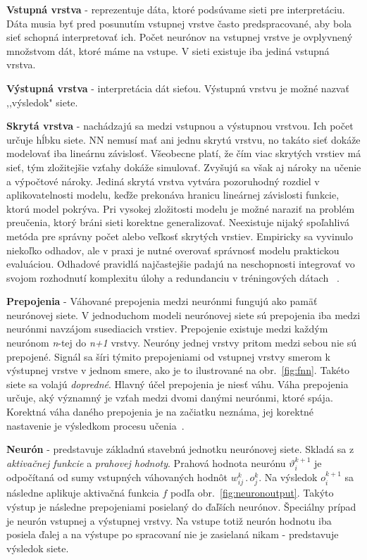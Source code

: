 \textbf{Vstupná vrstva} - reprezentuje dáta, ktoré podsúvame sieti pre interpretáciu. Dáta musia byť pred posunutím vstupnej vrstve často predspracované, aby bola sieť schopná interpretovať ich. Počet neurónov na vstupnej vrstve je ovplyvnený množstvom dát, ktoré máme na vstupe. V sieti existuje iba jediná vstupná vrstva.
\noindent

\textbf{Výstupná vrstva} - interpretácia dát sieťou. Výstupnú vrstvu je možné nazvať ,,výsledok"  siete.
\noindent

\textbf{Skrytá vrstva} - nachádzajú sa medzi vstupnou a výstupnou vrstvou. Ich počet určuje hĺbku siete. NN nemusí mať ani jednu skrytú vrstvu, no takáto sieť dokáže modelovať iba lineárnu závislosť. Všeobecne platí, že čím viac skrytých vrstiev má sieť, tým zložitejšie vzťahy dokáže simulovať. Zvyšujú sa však aj nároky na učenie a výpočtové nároky. Jediná skrytá vrstva vytvára pozoruhodný rozdiel v aplikovatelnosti modelu, keďže prekonáva hranicu lineárnej závislosti funkcie, ktorú model pokrýva. Pri vysokej zložitosti modelu je možné naraziť na problém preučenia, ktorý bráni sieti korektne generalizovať. Neexistuje nijaký spoľahlivá metóda pre správny počet alebo veľkosť skrytých vrstiev. Empiricky sa vyvinulo niekoľko odhadov, ale v praxi je nutné overovať správnosť modelu praktickou evaluáciou. Odhadové pravidlá najčastejšie padajú na neschopnosti integrovať vo svojom rozhodnutí komplexitu úlohy a redundanciu v tréningových dátach ~\cite{Goodfellow-et-al-2016-Book}.
\noindent

\textbf{Prepojenia} - Váhované prepojenia medzi neurónmi fungujú ako pamäť neurónovej siete. V jednoduchom modeli neurónovej siete sú prepojenia iba medzi neurónmi navzájom susediacich vrstiev. Prepojenie existuje medzi každým neurónom \textit{n}-tej do \textit{n+1} vrstvy. Neuróny jednej vrstvy pritom medzi sebou nie sú prepojené. Signál sa šíri týmito prepojeniami od vstupnej vrstvy smerom k výstupnej vrstve v jednom smere, ako je to ilustrované na obr.~\ref{fig:fnn}. Takéto siete sa volajú \textit{dopredné}. Hlavný účel prepojenia je niesť váhu. Váha prepojenia určuje, aký významný je vzťah medzi dvomi danými neurónmi, ktoré spája. Korektná váha daného prepojenia je na začiatku neznáma, jej korektné nastavenie je výsledkom procesu učenia~\cite{Goodfellow-et-al-2016-Book}.
\noindent

\textbf{Neurón} - predstavuje základnú stavebnú jednotku neurónovej siete. Skladá sa z \textit{aktivačnej funkcie} a \textit{prahovej hodnoty}. Prahová hodnota neurónu $\vartheta _{i}^{k+1}$  je odpočítaná od sumy vstupných váhovaných hodnôt $ w_{ij}^{k}\, .\, o_{j}^{k}$. 
\newline
Na výsledok $o_{i}^{k+1}$ sa následne aplikuje aktivačná funkcia $f$ podľa obr.~\ref{fig:neuronoutput}. Takýto výstup je následne prepojeniami posielaný do ďaľších neurónov. Špeciálny prípad je neurón vstupnej a výstupnej vrstvy. Na vstupe totiž neurón hodnotu iba posiela ďalej a na výstupe po spracovaní nie je zasielaná nikam - predstavuje výsledok siete.
\newline



